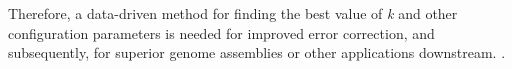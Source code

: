 Therefore, a data-driven  method for finding the best value of \textit{k} and other configuration parameters is needed for improved error correction, and subsequently, for superior genome assemblies or other applications downstream. .



